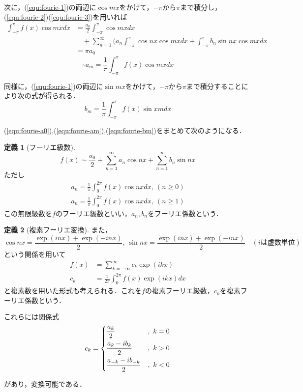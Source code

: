 \documentclass[11pt,a4paper,titlepage]{jsreport}
\theoremstyle{definition}
\newtheorem{dfn}{定義}
\begin{document}
次に，(\ref{equ:fourie-1})の両辺に$\cos mx$をかけて，$-\pi$から$\pi$まで積分し，(\ref{equ:fourie-2})(\ref{equ:fourie-3})を用いれば
\begin{align*}
  \int_{-\pi}^{\pi} f(x) \cos mx dx & = \frac{a_0}{2} \int_{-\pi}^{\pi} \cos mx dx                                                                   \\
                                    & \quad + \sum_{n=1}^{\infty} (a_n \int_{-\pi}^{\pi}\cos nx \cos mx dx + \int_{-\pi}^{\pi}b_n \sin nx \cos mx dx \\
                                    & = \pi a_0
\end{align*}
\begin{equation}
  \label{equ:fourie-am}
  \therefore a_m = \frac{1}{\pi}\int_{-\pi}^{\pi} f(x) \cos mx dx
\end{equation}

同様に，(\ref{equ:fourie-1})の両辺に$\sin mx$をかけて，$-\pi$から$\pi$まで積分することにより次の式が得られる．
\begin{equation}
  \label{equ:fourie-bm}
  b_m = \frac{1}{\pi}\int_{-\pi}^{\pi} f(x)\sin xm dx
\end{equation}

(\ref{equ:fourie-a0}),(\ref{equ:fourie-am}),(\ref{equ:fourie-bm})をまとめて次のようになる．

\begin{dfn}[フーリエ級数]
  \begin{equation*}
    f(x) \sim \frac{a_0}{2} + \sum_{n=1}^{\infty} a_n \cos nx + \sum_{n=1}^{\infty} b_n \sin nx
  \end{equation*}
  ただし
  \begin{align*}
    a_n = \frac{1}{\pi} \int_{0}^{2\pi} f(x) \cos nx dx,\ (n\geq 0) \\
    a_n = \frac{1}{\pi} \int_{0}^{2\pi} f(x) \cos nx dx,\ (n\geq 1)
  \end{align*}
  この無限級数を$f$のフーリエ級数といい，$a_n,b_n$をフーリエ係数という．
\end{dfn}

\begin{dfn}[複素フーリエ変換]
  また，$$\cos nx = \frac{\exp (inx) + \exp (-inx)}{2},\ \sin nx = \frac{\exp (inx) + \exp(-inx)}{2}\quad (iは虚数単位)$$という関係を用いて
  \begin{align*}
    f(x) & = \sum_{k=-\infty}^{\infty} c_k \exp(ikx)          \\
    c_k  & = \frac{1}{2\pi} \int_{0}^{2\pi} f(x)\exp (ikx) dx
  \end{align*}
  と複素数を用いた形式も考えられる．これを$f$の複素フーリエ級数，$c_k$を複素フーリエ係数という．

  これらには関係式
  \begin{align*}
    c_k=
    \begin{dcases}
      \frac{a_k}{2}            & ,\ k=0 \\
      \frac{a_k-ib_k}{2}       & ,\ k>0 \\
      \frac{a_{-k}-ib_{-k}}{2} & ,\ k<0
    \end{dcases}
  \end{align*}
\end{dfn}
があり，変換可能である．
\end{document}
